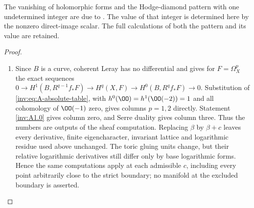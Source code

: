 The vanishing of holomorphic forms and the Hodge-diamond
pattern with one undetermined integer are due to
\citet[Proposition~9.20, p.~80; Theorem~9.1(vi), p.~65]{AC2026}.
The value of that integer is determined here by the nonzero direct-image
scalar. The full calculations of both the pattern and its value are retained.

\begin{proof}
\begin{enumerate}[label=\arabic*.,leftmargin=*]
\item Since $B$ is a curve, coherent Leray has no differential and gives
for $F=\Omega_X^p$ the exact sequences
$0\to H^1(B,R^{q-1}f_*F)\to H^q(X,F)\to H^0(B,R^qf_*F)\to0$.
Substitution of \eqref{inv:eq:A-absolute-table}, with
$h^0(\OO)=h^1(\OO(-2))=1$ and all cohomology of $\OO(-1)$ zero,
gives columns $p=1,2$ directly.  Statement \ref{inv:A1.0} gives column zero,
and Serre duality gives column three.  Thus the numbers are outputs
of the sheaf computation.  Replacing $\beta$ by $\beta+c$ leaves
every derivative, finite eigencharacter, invariant lattice and
logarithmic residue used above unchanged.  The toric gluing units
change, but their relative logarithmic derivatives still differ only
by base logarithmic forms.  Hence the same computations apply at
each admissible $c$, including every point arbitrarily close to the
strict boundary; no manifold at the excluded boundary is asserted.
\end{enumerate}
\end{proof}

